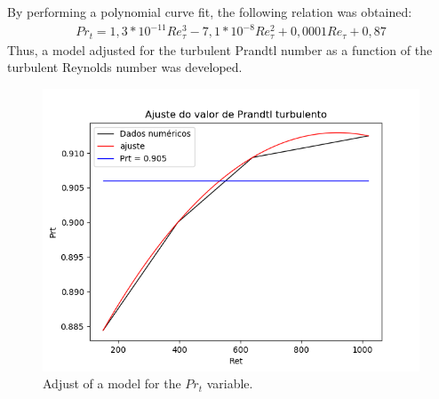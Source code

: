 \documentclass[10pt]{article} %
\begin{document}
By performing a polynomial curve fit, the following relation was obtained:
\begin{equation}
\begin{split}
Pr_t = 1,3 * 10^{-11} Re_\tau^3 - 7,1 * 10^{-8} Re_\tau^2 + 0,0001 Re_\tau + 0,87 
\end{split}
\end{equation}
Thus, a model adjusted for the turbulent Prandtl number as a function of the turbulent Reynolds number was developed.
	\begin{figure}[!h]
	\centering
	\includegraphics[angle=0, scale=0.43]{ajustePrandtl}
	\caption{Adjust of a model for the $ Pr_t $ variable.}
\end{figure}
\end{document}
